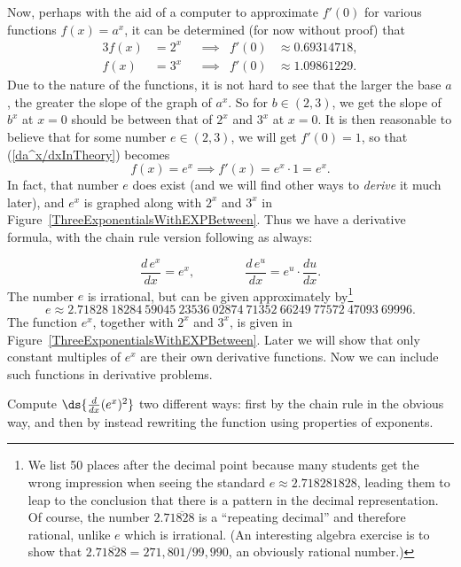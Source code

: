 Now, perhaps with the aid of a computer to approximate $f'(0)$
for various functions $f(x)=a^x$, it can be determined (for now without proof)
that
\begin{alignat*}{3}
f(x)&=2^x&&\implies&f'(0)&\approx0.69314718,\\
f(x)&=3^x&&\implies&f'(0)&\approx1.09861229.\end{alignat*}
Due to the nature of the functions, it is not hard to see that the
larger the base $a$, the greater the slope of the graph of $a^x$.
So for $b\in(2,3)$, we get the slope of $b^x$ at $x=0$ should
be between that of $2^x$ and $3^x$ at $x=0$.
It is then reasonable to believe that for some number
$e\in(2,3)$, we will get $f'(0)=1$, so that (\ref{da^x/dxInTheory})
becomes
\begin{equation}f(x)=e^x\implies f'(x)=e^x\cdot1=e^x.\end{equation}
In fact, that number $e$ does exist (and we will find other ways 
to {\it derive} it much later), and $e^x$ is 
graphed along with $2^x$ and $3^x$ in 
Figure~\ref{ThreeExponentialsWithEXPBetween}.
Thus we  have a derivative
formula, with the chain rule version following as always:

\begin{equation}
\frac{d\,e^x}{dx}=e^x,\label{DerivativeOfEXP}\qquad\qquad
\frac{d\,e^u}{dx}=e^u\cdot\frac{du}{dx}.
\end{equation}
The number $e$ is irrational, but can be given approximately by\footnote{%
We list 50 places after the decimal point because many students get the
wrong impression when seeing the standard $e\approx2.718281828$, leading
them to leap to the conclusion that there is a pattern in the decimal
representation.  Of course, the number $2.7\overline{1828}$ is
a ``repeating decimal'' and therefore rational, unlike $e$ which is
irrational.  (An interesting algebra exercise is to show that
$2.7\overline{1828}=271,801/99,990$, an obviously rational number.)%
}
\begin{equation}
e\approx2.71828\ 18284\ 59045\ 23536\ 02874\ 71352\ 66249\ 77572\ 47093\ 69996.
\label{EXP(1),Approximately}
\end{equation}
The function $e^x$, together with $2^x$ and $3^x$, is given 
in Figure~\ref{ThreeExponentialsWithEXPBetween}.
Later we will show that only constant multiples of $e^x$
are their own derivative functions.  Now we can
include such functions in derivative problems.



\bex Compute $\ds{\frac{d}{dx}(e^x)^2}$ two different ways:
first by the chain rule in the obvious way, and then by
instead rewriting the function using properties of exponents.

